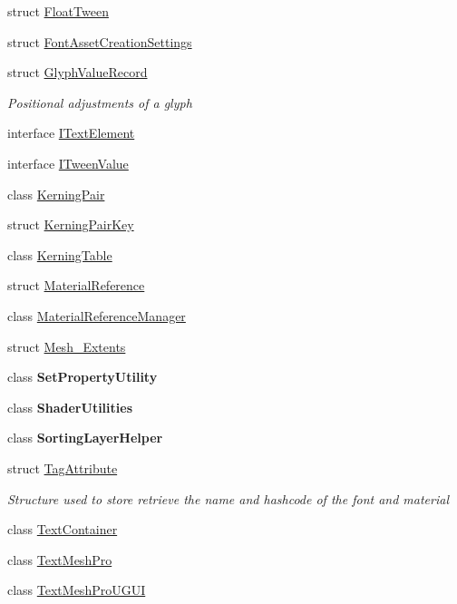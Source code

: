 \begin{DoxyCompactItemize}
\item 
struct \mbox{\hyperlink{struct_t_m_pro_1_1_float_tween}{Float\+Tween}}
\item 
struct \mbox{\hyperlink{struct_t_m_pro_1_1_font_asset_creation_settings}{Font\+Asset\+Creation\+Settings}}
\item 
struct \mbox{\hyperlink{struct_t_m_pro_1_1_glyph_value_record}{Glyph\+Value\+Record}}
\begin{DoxyCompactList}\small\item\em Positional adjustments of a glyph \end{DoxyCompactList}\item 
interface \mbox{\hyperlink{interface_t_m_pro_1_1_i_text_element}{I\+Text\+Element}}
\item 
interface \mbox{\hyperlink{interface_t_m_pro_1_1_i_tween_value}{I\+Tween\+Value}}
\item 
class \mbox{\hyperlink{class_t_m_pro_1_1_kerning_pair}{Kerning\+Pair}}
\item 
struct \mbox{\hyperlink{struct_t_m_pro_1_1_kerning_pair_key}{Kerning\+Pair\+Key}}
\item 
class \mbox{\hyperlink{class_t_m_pro_1_1_kerning_table}{Kerning\+Table}}
\item 
struct \mbox{\hyperlink{struct_t_m_pro_1_1_material_reference}{Material\+Reference}}
\item 
class \mbox{\hyperlink{class_t_m_pro_1_1_material_reference_manager}{Material\+Reference\+Manager}}
\item 
struct \mbox{\hyperlink{struct_t_m_pro_1_1_mesh___extents}{Mesh\+\_\+\+Extents}}
\item 
class {\bfseries Set\+Property\+Utility}
\item 
class {\bfseries Shader\+Utilities}
\item 
class {\bfseries Sorting\+Layer\+Helper}
\item 
struct \mbox{\hyperlink{struct_t_m_pro_1_1_tag_attribute}{Tag\+Attribute}}
\begin{DoxyCompactList}\small\item\em Structure used to store retrieve the name and hashcode of the font and material \end{DoxyCompactList}\item 
class \mbox{\hyperlink{class_t_m_pro_1_1_text_container}{Text\+Container}}
\item 
class \mbox{\hyperlink{class_t_m_pro_1_1_text_mesh_pro}{Text\+Mesh\+Pro}}
\item 
class \mbox{\hyperlink{class_t_m_pro_1_1_text_mesh_pro_u_g_u_i}{Text\+Mesh\+Pro\+U\+G\+UI}}

\end{DoxyCompactItemize}
